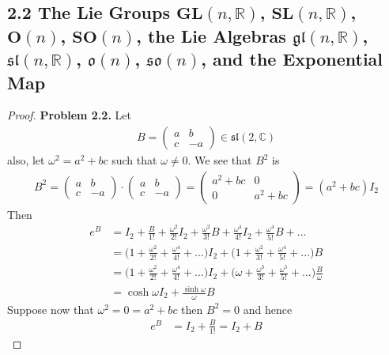 \documentclass[11pt]{article}
\newcommand{\R}{\mathbb{R}}
\newcommand{\C}{\mathbb{C}}
\theoremstyle{definition}
\begin{document}
\subsection*{2.2 The Lie Groups $\bm{GL}(n, \R)$, $\bm{SL}(n, \R)$, $\bm{O}(n)$,
$\bm{SO}(n)$, the Lie Algebras $\mathfrak{gl}(n, \R)$, $\mathfrak{sl}(n, \R)$,
$\mathfrak{o}(n)$, $\mathfrak{so}(n)$, and the Exponential Map}
\begin{proof}{\textbf{Problem 2.2.}}
    Let
    \begin{align*}
        B = \begin{pmatrix}
            a & b\\ c &-a
        \end{pmatrix} \in \mathfrak{sl}(2, \C)
    \end{align*}
    also, let $\omega^2 = a^2 + bc$ such that $\omega \neq 0$.
    We see that $B^2$ is
    \begin{align*}
        B^2 = \begin{pmatrix}a & b\\ c &-a \end{pmatrix}
        \cdot \begin{pmatrix} a & b\\ c &-a \end{pmatrix}
        = \begin{pmatrix} a^2 + bc & 0\\ 0 & a^2 +bc \end{pmatrix}
        = (a^2 + bc)I_2
    \end{align*}
    Then
    \begin{align*}
        e^B &= I_2 + \frac{B}{1!} + \frac{\omega^2}{2!}I_2
        + \frac{\omega^2}{3!}B + \frac{\omega^4}{4!}I_2 + \frac{\omega^4}{5!}B
        + ...\\
        &= \bigg(1 + \frac{\omega^2}{2!} + \frac{\omega^4}{4!} + ...\bigg)I_2
        +  \bigg(1 + \frac{\omega^2}{3!} + \frac{\omega^4}{5!} + ...\bigg)B\\
        &= \bigg(1 + \frac{\omega^2}{2!} + \frac{\omega^4}{4!} + ...\bigg)I_2
        + \bigg(\omega + \frac{\omega^3}{3!} + \frac{\omega^5}{5!} + ...\bigg)
        \frac{B}{\omega}\\
        &= \cosh\omega I_2 + \frac{\sinh\omega}{\omega}B
    \end{align*}
    Suppose now that $\omega^2 = 0 = a^2 + bc$ then $B^2 = 0$ and hence
    \begin{align*}
        e^B &= I_2 + \frac{B}{1!} = I_2 + B
    \end{align*}

\end{proof}
\end{document}
